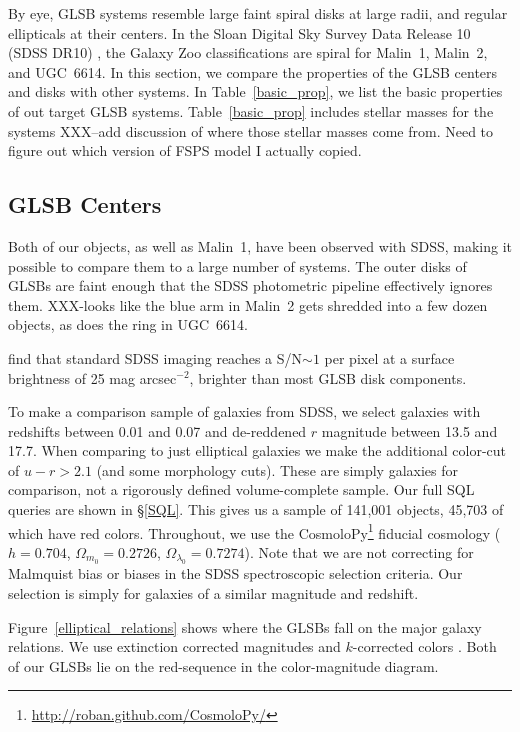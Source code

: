 \documentclass[12pt,preprint]{aastex}
\begin{document}
By eye, GLSB systems resemble large faint spiral disks at large radii, and regular ellipticals at their centers.
In the Sloan Digital Sky Survey Data Release 10 (SDSS DR10) \citep{Ahn14}, the Galaxy Zoo classifications \citep{Willett13} are spiral for Malin~1, Malin~2, and UGC~6614.
In this section, we compare the properties of the GLSB centers and disks with other systems.
In Table~\ref{basic_prop}, we list the basic properties of out target GLSB systems. Table~\ref{basic_prop} includes stellar masses for the systems XXX--add discussion of where those stellar masses come from. Need to figure out which version of FSPS model I actually copied. %
% 

\subsection{GLSB Centers}\label{sec:centers}

Both of our objects, as well as Malin~1, have been observed with SDSS, making it possible to compare them to a large number of systems.
The outer disks of GLSBs are faint enough that the SDSS photometric pipeline effectively ignores them. 
XXX-looks like the blue arm in Malin~2 gets shredded into a few dozen objects, as does the ring in UGC~6614.

\citet{Bakos12} find that standard SDSS imaging reaches a S/N$\sim1$ per pixel at a surface brightness of 25 mag arcsec$^{-2}$, brighter than most GLSB disk components.

To make a comparison sample of galaxies from SDSS, we select galaxies with redshifts between 0.01 and 0.07 and de-reddened $r$ magnitude between 13.5 and 17.7.
When comparing to just elliptical galaxies we make the additional color-cut of $u-r > 2.1$ (and some morphology cuts).
These are simply galaxies for comparison, not a rigorously defined volume-complete sample.
Our full SQL queries are shown in \S\ref{SQL}.
This gives us a sample of 141,001 objects, 45,703 of which have red colors.
Throughout, we use the CosmoloPy\footnote{\url{http://roban.github.com/CosmoloPy/}} fiducial cosmology ($h=0.704$, $\Omega_{m_0}=0.2726$, $\Omega_{\lambda_0}=0.7274$).
Note that we are not correcting for Malmquist bias or biases in the SDSS spectroscopic selection criteria.
Our selection is simply for galaxies of a similar magnitude and redshift.


Figure~\ref{elliptical_relations} shows where the GLSBs fall on the major galaxy relations.
We use extinction corrected magnitudes and $k$-corrected colors \citep{Chilingarian10}.
Both of our GLSBs lie on the red-sequence in the color-magnitude diagram.
\end{document}

